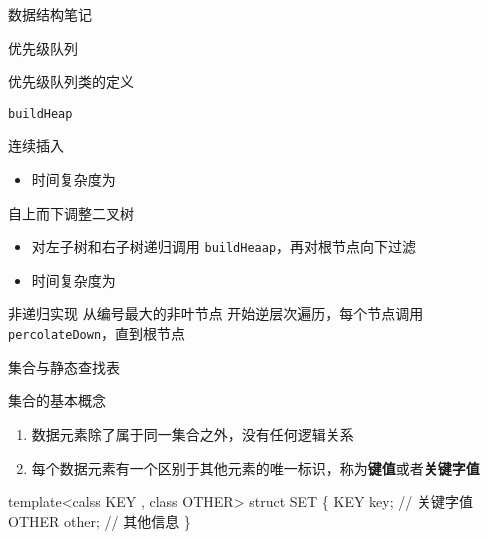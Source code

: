 \documentclass[
  ignorenonframetext,
]{beamer}
\newenvironment{Shaded}{}{}
\newcommand{\NormalTok}[1]{#1}
\providecommand{\tightlist}{%
  \setlength{\itemsep}{0pt}\setlength{\parskip}{0pt}}
\begin{document}
\begin{frame}[fragile]{数据结构笔记}
\begin{block}{优先级队列}
\begin{block}{优先级队列类的定义}
\begin{block}{\texttt{buildHeap}}
\protect{}\label{buildheap}
\begin{block}{连续插入}
\protect{}\label{ux8fdeux7eedux63d2ux5165}
\begin{itemize}
\tightlist
\item
  时间复杂度为 {}
\end{itemize}
\end{block}

\begin{block}{自上而下调整二叉树}
\protect{}\label{ux81eaux4e0aux800cux4e0bux8c03ux6574ux4e8cux53c9ux6811}
\begin{itemize}
\tightlist
\item
  对左子树和右子树递归调用 \texttt{buildHeaap}，再对根节点向下过滤
\item
  时间复杂度为 {}
\end{itemize}
\end{block}

\begin{block}{非递归实现}
\protect{}\label{ux975eux9012ux5f52ux5b9eux73b0-1}
从编号最大的非叶节点 {} 开始逆层次遍历，每个节点调用
\texttt{percolateDown}，直到根节点
\end{block}
\end{block}
\end{block}
\end{block}

\begin{block}{集合与静态查找表}
\protect{}\label{ux96c6ux5408ux4e0eux9759ux6001ux67e5ux627eux8868}
\begin{block}{集合的基本概念}
\protect{}\label{ux96c6ux5408ux7684ux57faux672cux6982ux5ff5}
\begin{enumerate}
\tightlist
\item
  数据元素除了属于同一集合之外，没有任何逻辑关系
\item
  每个数据元素有一个区别于其他元素的唯一标识，称为\textbf{键值}或者\textbf{关键字值}
\end{enumerate}

\begin{Shaded}
\begin{Highlighting}[]
\NormalTok{template\textless{}calss KEY , class OTHER\textgreater{}}
\NormalTok{struct SET}
\NormalTok{\{}
\NormalTok{  KEY key; // 关键字值}
\NormalTok{  OTHER other; // 其他信息}
\NormalTok{\}}
\end{Highlighting}
\end{Shaded}


\end{block}
\end{block}
\end{frame}
\end{document}
